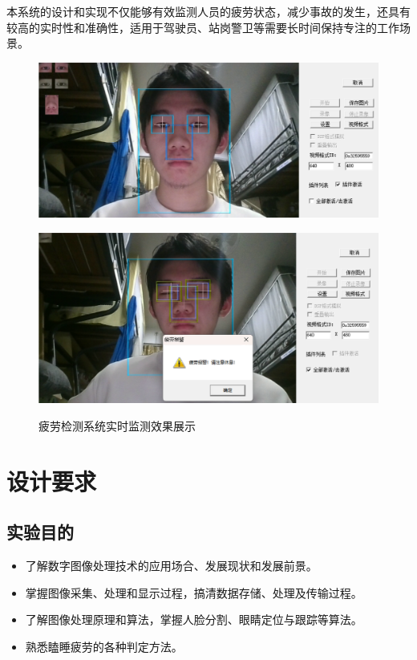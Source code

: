 \documentclass[12pt,hyperref,a4paper,UTF8]{ctexart}
\begin{document}
本系统的设计和实现不仅能够有效监测人员的疲劳状态，减少事故的发生，还具有较高的实时性和准确性，适用于驾驶员、站岗警卫等需要长时间保持专注的工作场景。
\begin{figure}[H]
    \centering
    \begin{minipage}{0.45\textwidth}
        \centering
        \includegraphics[width=\textwidth]{./figures/fig/image20.png}
        \label{fig:frame4}
    \end{minipage}
    \begin{minipage}{0.45\textwidth}
        \centering
        \includegraphics[width=\textwidth]{./figures/fig/image22.png}
        \label{fig:frame5}
    \end{minipage}
    \caption{疲劳检测系统实时监测效果展示}
    \label{fig:frames}
\end{figure}

\newpage
\section{设计要求}
    \subsection{实验目的}
        \begin{itemize}
            \item 了解数字图像处理技术的应用场合、发展现状和发展前景。
            \item 掌握图像采集、处理和显示过程，搞清数据存储、处理及传输过程。
            \item 了解图像处理原理和算法，掌握人脸分割、眼睛定位与跟踪等算法。
            \item 熟悉瞌睡疲劳的各种判定方法。
        \end{itemize}
        
\end{document}

